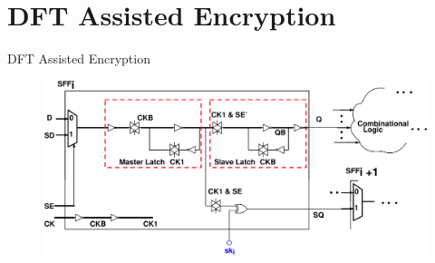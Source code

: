 \section{DFT Assisted Encryption}
\begin{frame}{DFT Assisted Encryption}
\begin{figure}
\begin{center}
\includegraphics[scale=0.2]{fig/encrypted-scanflop-2.pdf}
\end{center}
\end{figure}
\end{frame}
